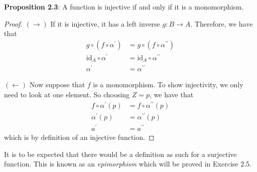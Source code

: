 \documentclass{report}
\begin{document}
\textbf{Proposition 2.3}: A function is injective if and only if it is a monomorphism.
    \begin{proof}
        $(\rightarrow )$ If it is injective, it has a left inverse $g: B \rightarrow A$. Therefore, we have that 
        \begin{align*}
            g \circ (f \circ \alpha^{\prime}) &= g \circ (f \circ \alpha^{\prime\prime}) \\
            \text{id}_{A} \circ \alpha^{\prime} &= \text{id}_{A} \circ \alpha^{\prime\prime} \\
            \alpha^{\prime} &= \alpha^{\prime\prime}
        \end{align*}

    $(\leftarrow )$ Now suppose that $f$ is a monomorphism. To show injectivity, we only need to look at one element. So choosing $Z = {p}$, we have that 
        \begin{align*}
            f \circ \alpha^{\prime}(p) &= f \circ \alpha^{\prime\prime}(p) \\
            \alpha^{\prime}(p) &= \alpha^{\prime\prime}(p) \\
            a^{\prime} &= a^{\prime\prime}
        \end{align*}
    which is by definition of an injective function.
    \end{proof}

It is to be expected that there would be a definition as such for a surjective function. This is known as an \textit{epimorphism} which will be proved in Exercise 2.5.
\end{document}

